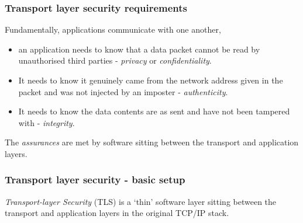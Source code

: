 \documentclass[10pt, hyperref={pdfpagelabels=false}]{beamer}
\begin{document}
\begin{frame}
\frametitle{Transport layer security requirements}
Fundamentally, applications communicate with one another,
\begin{itemize}
\item an application needs to know that a data packet cannot be read by unauthorised third parties - \emph{\color{blue}privacy} or \emph{\color{blue}confidentiality}.
\item It needs to know it genuinely came from the network address given in the packet and was not injected by an imposter - \emph{\color{blue}authenticity}.
\item It needs to know the data contents are as sent and have not been tampered with - \emph{\color{blue}integrity}.
\end{itemize} 

The \emph{assurances} are met by software sitting between the transport and application layers.
\end{frame}

\begin{frame}
\frametitle{Transport layer security - basic setup}
\begin{center}
\end{center}

\emph{Transport-layer Security} (TLS) is a `thin' software layer sitting between the transport and application layers in the original TCP/IP stack.
\end{frame}
\end{document}
